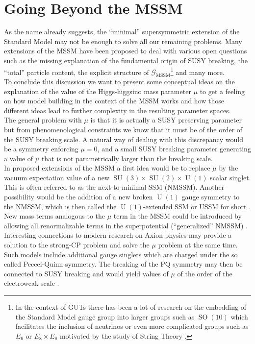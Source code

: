\section{Going Beyond the MSSM}
As the name already suggests, the \enquote{minimal} supersymmetric extension of the Standard Model may not be enough to solve all our remaining problems. Many extensions of the MSSM have been proposed to deal with various open questions such as the missing explanation of the fundamental origin of SUSY breaking, the \enquote{total} particle content, the explicit structure of $\mathcal{G}_{\mathrm{MSSM}}$\footnote{In the context of GUTs there has been a lot of research on the embedding of the Standard Model gauge group into larger groups such as $\operatorname{SO}(10)$ which facilitates the inclusion of neutrinos or even more complicated groups such as $E_6$ or $E_8\times E_8$ motivated by the study of String Theory \cite{Langacker2012}.} and many more. \\ To conclude this discussion we want to present some conceptual ideas on the explanation of the value of the Higgs-higgsino mass parameter $\mu$ to get a feeling on how model building in the context of the MSSM works and how those different ideas lead to further complexity in the resulting parameter spaces.\\
The general problem with $\mu$ is that it is actually a SUSY preserving parameter but from phenomenological constraints we know that it must be of the order of the SUSY breaking scale.  A natural way of dealing with this discrepancy would be a symmetry enforcing $\mu=0$, and a small SUSY breaking parameter generating a value of $\mu$ that is not parametrically larger than the breaking scale.\\
In proposed extensions of the MSSM a first idea would be to replace $\mu$ by the vacuum expectation value of a new $\operatorname{SU}(3)\times\operatorname{SU}(2)\times\operatorname{U}(1)$ scalar singlet. This is often referred to as the next-to-minimal SSM (NMSSM). Another possibility would be the addition of a new broken $\operatorname{U}(1)$ gauge symmetry to  the NMSSM, which is then called the $\operatorname{U}(1)$-extended SSM or USSM for short \cite{Cvetic1997}. New mass terms analogous to the $\mu$ term in the MSSM could be introduced by allowing all renormalizable terms in the superpotential (\enquote{generalized} NMSSM) \cite{Ross2012}. \\
Interesting connections to modern research on Axion physics may provide a solution to the strong-CP problem and solve the $\mu$ problem at the same time. Such models include additional gauge singlets which are charged under the so called Peccei-Quinn symmetry. The breaking of the PQ symmetry may then be connected to SUSY breaking and would yield values of $\mu$ of the order of the electroweak scale \cite{Peccei2006}. \\

